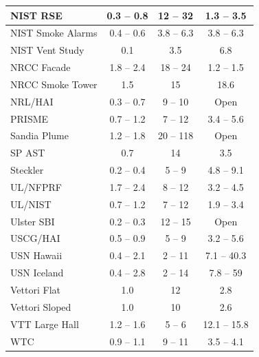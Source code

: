 \begin{table}[!t]
\begin{tabular}{|l|c|c|c|}
NIST RSE            & 0.3 -- 0.8    & 12 -- 32      & 1.3 -- 3.5    \\ \hline
NIST Smoke Alarms   & 0.4 -- 0.6    & 3.8 -- 6.3    & 3.8 -- 6.3    \\ \hline
NIST Vent Study     & 0.1           & 3.5           & 6.8           \\ \hline
NRCC Facade         & 1.8 -- 2.4    & 18 -- 24      & 1.2 -- 1.5    \\ \hline
NRCC Smoke Tower    & 1.5           & 15            & 18.6          \\ \hline
NRL/HAI             & 0.3 -- 0.7    & 9 -- 10       & Open          \\ \hline
PRISME              & 0.7 -- 1.2    & 7 -- 12       & 3.4 -- 5.6    \\ \hline
Sandia Plume        & 1.2 -- 1.8    & 20 -- 118     & Open          \\ \hline
SP AST              & 0.7           & 14            & 3.5           \\ \hline
Steckler            & 0.2 -- 0.4    & 5 -- 9        & 4.8 -- 9.1    \\ \hline
UL/NFPRF            & 1.7 -- 2.4    & 8 -- 12       & 3.2 -- 4.5    \\ \hline
UL/NIST             & 0.7 -- 1.2    & 7 -- 12       & 1.9 -- 3.4    \\ \hline
Ulster SBI          & 0.2 -- 0.3    & 12 -- 15      & Open          \\ \hline
USCG/HAI            & 0.5 -- 0.9    & 5 -- 9        & 3.2 -- 5.6    \\ \hline
USN Hawaii          & 0.4 -- 2.1    & 2 -- 11       & 7.1 -- 40.3   \\ \hline
USN Iceland         & 0.4 -- 2.8    & 2 -- 14       & 7.8 -- 59     \\ \hline
Vettori Flat        & 1.0           & 12            & 2.8           \\ \hline
Vettori Sloped      & 1.0           & 10            & 2.6           \\ \hline
VTT Large Hall      & 1.2 -- 1.6    & 5 -- 6        & 12.1 -- 15.8  \\ \hline
WTC                 & 0.9 -- 1.1    & 9 -- 11       & 3.5 -- 4.1    \\ \hline
\end{tabular}
\label{Numerical_Parameters}
\nopagebreak
\end{table}





